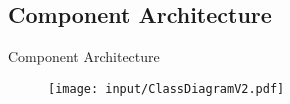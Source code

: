 \subsection{Component Architecture}
\begin{frame}{Component Architecture}


		\begin{figure}[p]%
		\texttt{[image: input/ClassDiagramV2.pdf]}%
		\end{figure}


\end{frame}
